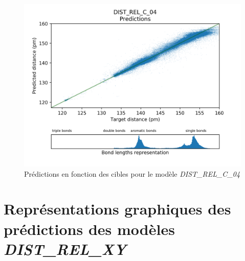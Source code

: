 \begin{figure}[!h]
	\centering
	
	\includegraphics[scale=0.8]{../figures/DIST_REL_C_04/DIST_REL_C_04_preds_targets.png}	
	
	\caption{Prédictions en fonction des cibles pour le modèle \emph{DIST\_REL\_C\_04}}
	
\end{figure}


\chapter{Représentations graphiques des prédictions des modèles \emph{DIST\_REL\_XY}}


